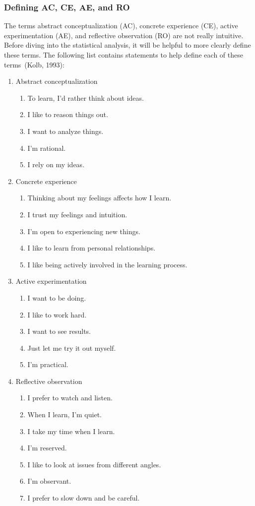 \subsubsection{Defining AC, CE, AE, and RO}
The terms abstract conceptualization (AC), concrete experience (CE), active experimentation (AE), and reflective observation (RO) are not really intuitive. Before diving into the statistical analysis, it will be helpful to more clearly define these terms. The following list contains statements to help define each of these terms~(Kolb, 1993):
\begin{enumerate}
  \item Abstract conceptualization
  \begin{enumerate}
    \item To learn, I'd rather think about ideas.
    \item I like to reason things out.
    \item I want to analyze things.
    \item I'm rational.
    \item I rely on my ideas.
  \end{enumerate}
  \item Concrete experience
  \begin{enumerate}
    \item Thinking about my feelings affects how I learn.
    \item I trust my feelings and intuition.
    \item I'm open to experiencing new things.
    \item I like to learn from personal relationships.
    \item I like being actively involved in the learning process.
  \end{enumerate}
  \item Active experimentation
  \begin{enumerate}
    \item I want to be doing.
    \item I like to work hard.
    \item I want to see results.
    \item Just let me try it out myself.
    \item I'm practical.
  \end{enumerate}
  \item Reflective observation
  \begin{enumerate}
    \item I prefer to watch and listen.
    \item When I learn, I'm quiet.
    \item I take my time when I learn.
    \item I'm reserved.
    \item I like to look at issues from different angles.
    \item I'm observant.
    \item I prefer to slow down and be careful.
  \end{enumerate}
\end{enumerate}

